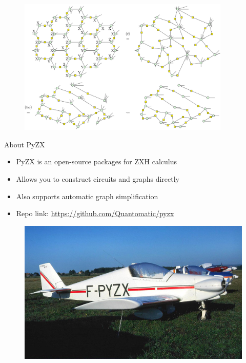 \documentclass[aspectratio=169,xcolor=dvipsnames, t]{beamer}
\begin{document}
\begin{frame}
\begin{figure}
    \includegraphics[width=0.9\textwidth]{figures/zx_graph_reduce_4.png}
\end{figure}
\end{frame}


\begin{frame}{About PyZX}
    \begin{itemize}
        \item PyZX is an open-source packages for ZXH calculus
        \item Allows you to construct circuits and graphs directly
        \item Also supports automatic graph simplification
        \item Repo link: \href{https://github.com/Quantomatic/pyzx}{https://github.com/Quantomatic/pyzx}
    \end{itemize}
    \begin{figure}
        \includegraphics[width=.5\textwidth]{figures/fpyzx.png}
    \end{figure}
\end{frame}
\end{document}
